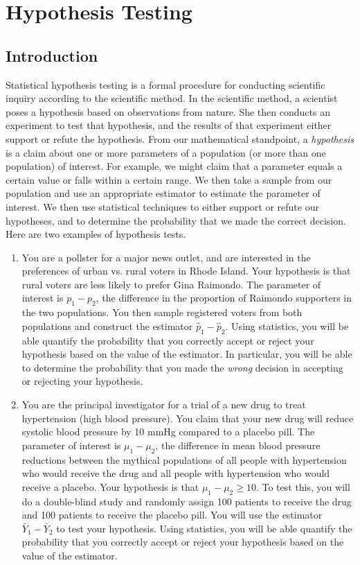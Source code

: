 \documentclass[notes.tex]{subfiles}
\begin{document}
\setcounter{section}{6}
\section{Hypothesis Testing}

\subsection{Introduction}
Statistical hypothesis testing is a formal procedure for conducting scientific inquiry according to the scientific method. In the scientific method, a scientist poses a hypothesis based on observations from nature. She then conducts an experiment to test that hypothesis, and the results of that experiment either support or refute the hypothesis. From our mathematical standpoint, a \emph{hypothesis} is a claim about one or more parameters of a population (or more than one population) of interest. For example, we might claim that a parameter equals a certain value or falls within a certain range. We then take a sample from our population and use an appropriate estimator to estimate the parameter of interest. We then use statistical techniques to either support or refute our hypotheses, and to determine the probability that we made the correct decision. \\

Here are two examples of hypothesis tests.
\begin{enumerate}
\item You are a pollster for a major news outlet, and are interested in the preferences of urban vs. rural voters in Rhode Island. Your hypothesis is that rural voters are less likely to prefer Gina Raimondo. The parameter of interest is $p_1 - p_2$, the difference in the proportion of Raimondo supporters in the two populations. You then sample registered voters from both populations and construct the estimator $\hat{p}_1 - \hat{p}_2$. Using statistics, you will be able quantify the probability that you correctly accept or reject your hypothesis based on the value of the estimator. In particular, you will be able to determine the probability that you made the \emph{wrong} decision in accepting or rejecting your hypothesis.

\item You are the principal investigator for a trial of a new drug to treat hypertension (high blood pressure). You claim that your new drug will reduce systolic blood pressure by 10 mmHg compared to a placebo pill. The parameter of interest is $\mu_1 - \mu_2$, the difference in mean blood pressure reductions between the mythical populations of all people with hypertension who would receive the drug and all people with hypertension who would receive a placebo. Your hypothesis is that $\mu_1 - \mu_2 \geq 10$. To test this, you will do a double-blind study and randomly assign 100 patients to receive the drug and 100 patients to receive the placebo pill. You will use the estimator $\bar{Y}_1 - \bar{Y}_2$ to test your hypothesis. Using statistics, you will be able quantify the probability that you correctly accept or reject your hypothesis based on the value of the estimator.
\end{enumerate}
\end{document}
